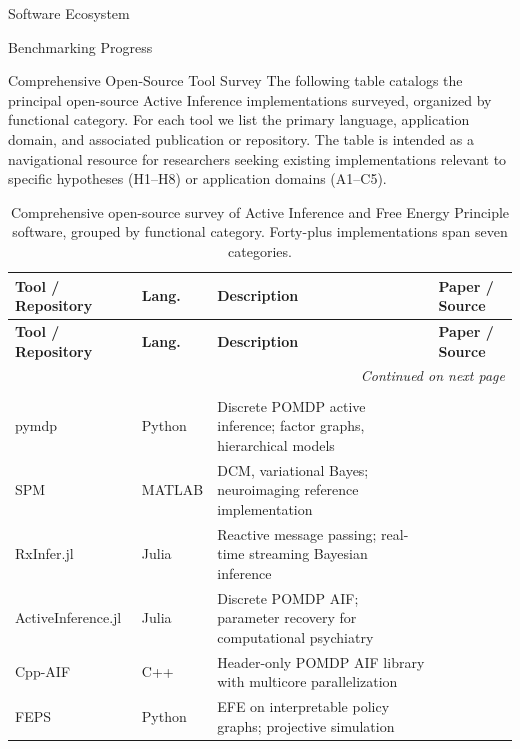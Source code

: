 \documentclass[
  ignorenonframetext,
]{beamer}
\begin{document}
\begin{frame}{Software Ecosystem}
\begin{block}{Benchmarking Progress}
\FloatBarrier
\end{block}

\begin{block}{Comprehensive Open-Source Tool Survey}
\protect{}\label{comprehensive-open-source-tool-survey}
The following table catalogs the principal open-source Active Inference
implementations surveyed, organized by functional category. For each
tool we list the primary language, application domain, and associated
publication or repository. The table is intended as a navigational
resource for researchers seeking existing implementations relevant to
specific hypotheses (H1--H8) or application domains (A1--C5).

\begin{center}
\small
\begin{longtable}{p{3.2cm} p{1.6cm} p{6.4cm} p{2.5cm}}
\caption{Comprehensive open-source survey of Active Inference and Free Energy Principle software, grouped by functional category. Forty-plus implementations span seven categories.}
\label{tab:tool_survey} \\
\toprule
\textbf{Tool / Repository} & \textbf{Lang.} & \textbf{Description} & \textbf{Paper / Source} \\
\midrule
\endfirsthead
\toprule
\textbf{Tool / Repository} & \textbf{Lang.} & \textbf{Description} & \textbf{Paper / Source} \\
\midrule
\endhead
\midrule
\multicolumn{4}{r}{\textit{Continued on next page}} \\
\endfoot
\bottomrule
\endlastfoot
\multicolumn{4}{c}{\textit{General-Purpose Frameworks}} \\
\midrule
pymdp & Python & Discrete POMDP active inference; factor graphs, hierarchical models & \cite{heins2022pymdp} \\
SPM & MATLAB & DCM, variational Bayes; neuroimaging reference implementation & \cite{friston2017active} \\
RxInfer.jl & Julia & Reactive message passing; real-time streaming Bayesian inference & \cite{rxinfer2025} \\
ActiveInference.jl & Julia & Discrete POMDP AIF; parameter recovery for computational psychiatry & \cite{ActiveInferencejl} \\
Cpp-AIF & C++ & Header-only POMDP AIF library with multicore parallelization & \cite{gregoretti2023cppaif} \\
FEPS & Python & EFE on interpretable policy graphs; projective simulation & \cite{pazem2024feps} \\

\end{longtable}
\end{center}
\end{block}
\end{frame}
\end{document}
